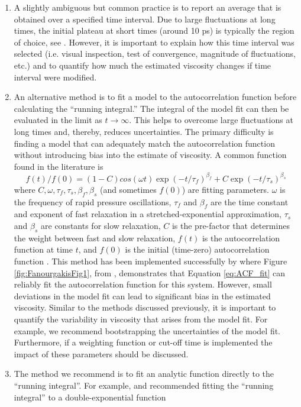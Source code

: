 \documentclass[9pt]{livecoms}
\begin{document}
\begin{enumerate}
\begin{enumerate}
		\item A slightly ambiguous but common practice is to report an average that is obtained over a specified time interval. Due to large fluctuations at long times, the initial plateau at short times (around 10 ps) is typically the region of choice, see \cite{Fanourgakis2012,Chen2009}. However, it is important to explain how this time interval was selected (i.e. visual inspection, test of convergence, magnitude of fluctuations, etc.) and to quantify how much the estimated viscosity changes if time interval were modified.
		\item An alternative method is to fit a model to the autocorrelation function before calculating the ``running integral.'' The integral of the model fit can then be evaluated in the limit as $t \to \infty$. This helps to overcome large fluctuations at long times and, thereby, reduces uncertainties. The primary difficulty is finding a model that can adequately match the autocorrelation function without introducing bias into the estimate of viscosity. A common function found in the literature is
		\begin{equation} \label{eq:ACF_fit}
		f(t)/f(0) = (1-C)cos(\omega t)\exp{(-t/\tau_f)^{\beta_f}} + C\exp{(-t/\tau_s)^{\beta_s}}
		\end{equation}
		where $C, \omega, \tau_f, \tau_s, \beta_f, \beta_s$ (and sometimes $f(0)$) are fitting parameters. $\omega$ is the frequency of rapid pressure oscillations, $\tau_f$ and $\beta_f$ are the time constant and exponent of fast relaxation in a stretched-exponential approximation, $\tau_s$ and $\beta_s$ are constants for slow relaxation, $C$ is the pre-factor that determines the weight between fast and slow relaxation, $f(t)$ is the autocorrelation function at time $t$, and $f(0)$ is the initial (time-zero) autocorrelation function \cite{GROMACS}. This method has been implemented successfully by \cite{Fanourgakis2012} where Figure \ref{fig:FanourgakisFig1}, from \cite{Fanourgakis2012}, demonstrates that Equation \ref{eq:ACF_fit} can reliably fit the autocorrelation function for this system. However, small deviations in the model fit can lead to significant bias in the estimated viscosity. Similar to the methods discussed previously, it is important to quantify the variability in viscosity that arises from the model fit. For example, we recommend bootstrapping the uncertainties of the model fit. Furthermore, if a weighting function or cut-off time is implemented the impact of these parameters should be discussed.
		\item The method we recommend is to fit an analytic function directly to the ``running integral''. For example, \cite{ReyCastro2006} and \cite{Zhang2015} recommended fitting the ``running integral'' to a double-exponential function \begin{equation}

\end{equation}
\end{enumerate}
\end{enumerate}
\end{document}
